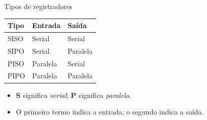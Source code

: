\begin{frame}{Tipos de registradores}
\begin{center}
\renewcommand{\arraystretch}{1.5}
\begin{tabular}{l|l|l}
Tipo & Entrada & Saída \\
\hline
SISO & Serial & Serial \\
SIPO & Serial & Paralela \\
PISO & Paralela & Serial \\
PIPO & Paralela & Paralela \\
\end{tabular}
\end{center}

\vspace{0.3cm}
\begin{itemize}
  \item \textbf{S} significa \textit{serial}; \textbf{P} significa \textit{paralela}.
  \item O primeiro termo indica a entrada; o segundo indica a saída.
\end{itemize}
\end{frame}